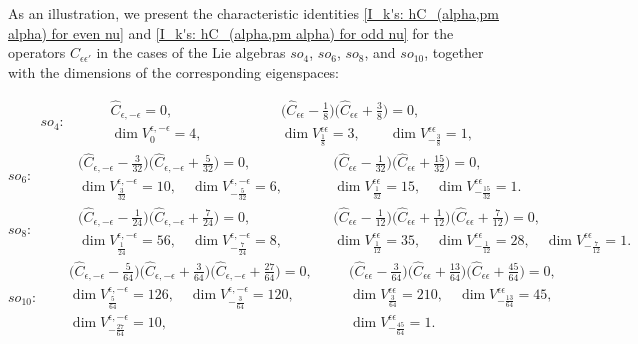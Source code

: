 \documentclass[a4paper]{article}
\newcommand{\hC}{\widehat{C}}
\renewcommand{\=}{\ =\ }
\numberwithin{equation}{section}
\theoremstyle{remark}
\begin{document}
As an illustration, we present the characteristic identities
\eqref{I_k's: hC_(alpha,pm alpha) for even nu} and
\eqref{I_k's: hC_(alpha,pm alpha) for odd nu}
for the operators $\hC_{\epsilon\epsilon'}$ in the cases of the Lie algebras
$so_4$, $so_6$, $so_8$, and $so_{10}$,
together with the dimensions of the corresponding eigenspaces:

\begin{equation}
so_4:\qquad
\begin{aligned}
&\hC_{\epsilon,-\epsilon}=0,& \qquad \qquad &\Big(\hC_{\epsilon\epsilon}-\frac{1}{8}\Big)\Big(\hC_{\epsilon\epsilon}+\frac{3}{8}\Big)=0,\\
&\dim V_0^{\epsilon,-\epsilon}=4,& &\dim V_{\frac{1}{8}}^{\epsilon\epsilon}=3,\qquad \dim V_{-\frac{3}{8}}^{\epsilon\epsilon}=1,
\end{aligned}
\end{equation}
\begin{equation}
so_6:\qquad
\begin{aligned}
&\Big(\hC_{\epsilon,-\epsilon}-\frac{3}{32}\Big)\Big(\hC_{\epsilon,-\epsilon}+\frac{5}{32}\Big)=0, &\qquad& \Big(\hC_{\epsilon\epsilon}-\frac{1}{32}\Big)\Big(\hC_{\epsilon\epsilon}+\frac{15}{32}\Big)=0,\\
&\dim V^{\epsilon,-\epsilon}_{\frac{3}{32}}=10,\quad \dim V^{\epsilon,-\epsilon}_{-\frac{5}{32}}=6,& & \dim V^{\epsilon\epsilon}_{\frac{1}{32}}=15,\quad \dim V^{\epsilon\epsilon}_{-\frac{15}{32}}=1.
\end{aligned}
\end{equation}
\begin{equation}
so_8:\qquad
\begin{aligned}
&\Big(\hC_{\epsilon,-\epsilon}-\frac{1}{24}\Big)\Big(\hC_{\epsilon,-\epsilon}+\frac{7}{24}\Big)=0, &\qquad& \Big(\hC_{\epsilon\epsilon}-\frac{1}{12}\Big)\Big(\hC_{\epsilon\epsilon}+\frac{1}{12}\Big)\Big(\hC_{\epsilon\epsilon}+\frac{7}{12}\Big)=0,\\
&\dim V^{\epsilon,-\epsilon}_{\frac{1}{24}}=56,\quad \dim V^{\epsilon,-\epsilon}_{-\frac{7}{24}}=8,& & \dim V^{\epsilon\epsilon}_{\frac{1}{12}}=35,\quad \dim V^{\epsilon\epsilon}_{-\frac{1}{12}}=28,\quad \dim V^{\epsilon\epsilon}_{-\frac{7}{12}}=1.
\end{aligned}
\end{equation}
\begin{equation}
so_{10}:\quad
\begin{aligned}
&\Big(\hC_{\epsilon,-\epsilon}-\frac{5}{64}\Big)\Big(\hC_{\epsilon,-\epsilon}+\frac{3}{64}\Big)\Big(\hC_{\epsilon,-\epsilon}+\frac{27}{64}\Big)=0, &\quad& \Big(\hC_{\epsilon\epsilon}-\frac{3}{64}\Big)\Big(\hC_{\epsilon\epsilon}+\frac{13}{64}\Big)\Big(\hC_{\epsilon\epsilon}+\frac{45}{64}\Big)=0,\\
&\dim V^{\epsilon,-\epsilon}_{\frac{5}{64}}=126,\quad \dim V^{\epsilon,-\epsilon}_{-\frac{3}{64}}=120,& & \dim V^{\epsilon\epsilon}_{\frac{3}{64}}=210,\quad \dim V^{\epsilon\epsilon}_{-\frac{13}{64}}=45,\\
&\dim V^{\epsilon,-\epsilon}_{-\frac{27}{64}}=10, & &\dim V^{\epsilon\epsilon}_{-\frac{45}{64}}=1.
\end{aligned}
\end{equation}
\end{document}
